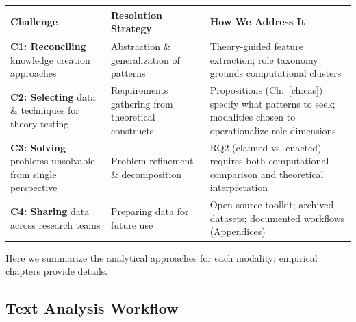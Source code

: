 \documentclass[../main.tex]{subfiles}
\begin{document}
\begin{center}
\small
\begin{tabular}{@{}p{3.2cm}p{3.8cm}p{4cm}@{}}
\toprule
\textbf{Challenge} & \textbf{Resolution Strategy} & \textbf{How We Address It} \\
\midrule
\textbf{C1: Reconciling} knowledge creation approaches & Abstraction \& generalization of patterns & Theory-guided feature extraction; role taxonomy grounds computational clusters \\
\addlinespace
\textbf{C2: Selecting} data \& techniques for theory testing & Requirements gathering from theoretical constructs & Propositions (Ch.~\ref{ch:cas}) specify what patterns to seek; modalities chosen to operationalize role dimensions \\
\addlinespace
\textbf{C3: Solving} problems unsolvable from single perspective & Problem refinement \& decomposition & RQ2 (claimed vs. enacted) requires both computational comparison and theoretical interpretation \\
\addlinespace
\textbf{C4: Sharing} data across research teams & Preparing data for future use & Open-source toolkit; archived datasets; documented workflows (Appendices) \\
\bottomrule
\end{tabular}
\label{tab:challenges-resolution}
\end{center}

Here we summarize the analytical approaches for each modality; empirical chapters provide details.

\subsection{Text Analysis Workflow}
\end{document}
